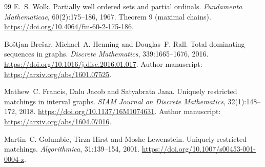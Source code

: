 \begin{thebibliography}{99}
E.~S. Wolk.
\newblock Partially well ordered sets and partial ordinals.
\newblock \emph{Fundamenta Mathematicae}, 60(2):175--186, 1967.
\newblock Theorem 9 (maximal chains).
\newblock \url{https://doi.org/10.4064/fm-60-2-175-186}.

Bo{\v s}tjan Bre{\v s}ar, Michael~A. Henning and Douglas~F. Rall.
\newblock Total dominating sequences in graphs.
\newblock \emph{Discrete Mathematics}, 339:1665--1676, 2016.
\newblock \url{https://doi.org/10.1016/j.disc.2016.01.017}.
\newblock Author manuscript: \url{https://arxiv.org/abs/1601.07525}.

Mathew~C. Francis, Dalu Jacob and Satyabrata Jana.
\newblock Uniquely restricted matchings in interval graphs.
\newblock \emph{SIAM Journal on Discrete Mathematics}, 32(1):148--172, 2018.
\newblock \url{https://doi.org/10.1137/16M1074631}.
\newblock Author manuscript: \url{https://arxiv.org/abs/1604.07016}.

Martin~C. Golumbic, Tirza Hirst and Moshe Lewenstein.
\newblock Uniquely restricted matchings.
\newblock \emph{Algorithmica}, 31:139--154, 2001.
\newblock \url{https://doi.org/10.1007/s00453-001-0004-z}.
\end{thebibliography}
